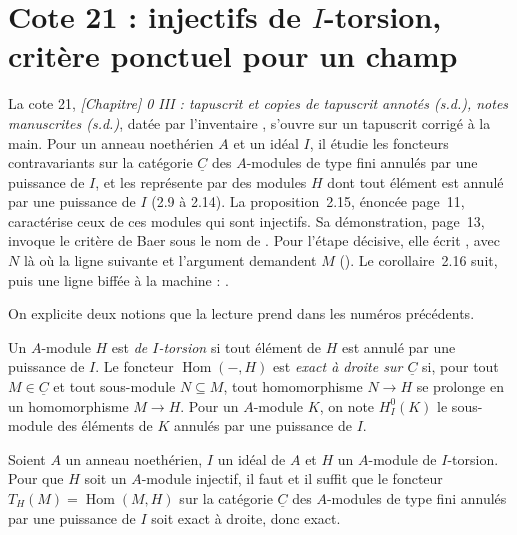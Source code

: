 \section[Cote 21 : injectifs de $I$-torsion, critère ponctuel pour un champ]{Cote 21 : injectifs de $I$-torsion, critère ponctuel pour un champ\protect{}}\label{sec:21}

La cote 21, \emph{[Chapitre] 0 III : tapuscrit et copies de tapuscrit annotés (s.d.), notes manuscrites (s.d.)}, datée par l'inventaire \q{[vers 1960-1967]}, s'ouvre sur un tapuscrit corrigé à la main. Pour un anneau noethérien $A$ et un idéal $I$, il étudie les foncteurs contravariants sur la catégorie $\underline{C}$ des $A$-modules de type fini annulés par une puissance de $I$, et les représente par des modules $H$ dont tout élément est annulé par une puissance de $I$ (2.9 à 2.14). La proposition~2.15, énoncée page~11, caractérise ceux de ces modules qui sont injectifs. Sa démonstration, page~13, invoque le critère de Baer sous le nom de . Pour l'étape décisive, elle écrit , avec $N$ là où la ligne suivante et l'argument demandent $M$ (). Le corollaire~2.16 suit, puis une ligne biffée à la machine : .

On explicite deux notions que la lecture prend dans les numéros précédents.

\begin{definition}
Un $A$-module $H$ est \emph{de $I$-torsion} si tout élément de $H$ est annulé par une puissance de $I$. Le foncteur $\operatorname{Hom}(-, H)$ est \emph{exact à droite sur $\underline{C}$} si, pour tout $M \in \underline{C}$ et tout sous-module $N \subseteq M$, tout homomorphisme $N \to H$ se prolonge en un homomorphisme $M \to H$. Pour un $A$-module $K$, on note $H^0_I(K)$ le sous-module des éléments de $K$ annulés par une puissance de $I$.
\end{definition}

\begin{enonce}
Soient $A$ un anneau noethérien, $I$ un idéal de $A$ et $H$ un $A$-module de $I$-torsion. Pour que $H$ soit un $A$-module injectif, il faut et il suffit que le foncteur $T_H(M) = \operatorname{Hom}(M, H)$ sur la catégorie $\underline{C}$ des $A$-modules de type fini annulés par une puissance de $I$ soit exact à droite, donc exact.
\end{enonce}

